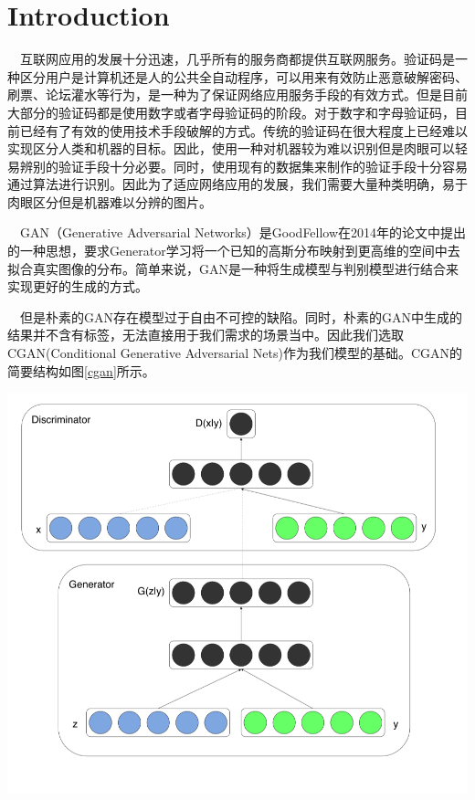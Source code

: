 \documentclass[12pt]{article}
\begin{document}
\section*{Introduction}

\ \ 互联网应用的发展十分迅速，几乎所有的服务商都提供互联网服务。验证码是一种区分用户是计算机还是人的公共全自动程序，可以用来有效防止恶意破解密码、刷票、论坛灌水等行为，是一种为了保证网络应用服务手段的有效方式。但是目前大部分的验证码都是使用数字或者字母验证码的阶段。对于数字和字母验证码，目前已经有了有效的使用技术手段破解的方式\supercite{10.1007}。传统的验证码在很大程度上已经难以实现区分人类和机器的目标。因此，使用一种对机器较为难以识别但是肉眼可以轻易辨别的验证手段十分必要。同时，使用现有的数据集来制作的验证手段十分容易通过算法进行识别。因此为了适应网络应用的发展，我们需要大量种类明确，易于肉眼区分但是机器难以分辨的图片。

\ \ GAN\supercite{NIPS2014_5423}（Generative Adversarial Networks）是GoodFellow在2014年的论文中提出的一种思想，要求Generator学习将一个已知的高斯分布映射到更高维的空间中去拟合真实图像的分布。简单来说，GAN是一种将生成模型与判别模型进行结合来实现更好的生成的方式。


\ \ 但是朴素的GAN存在模型过于自由不可控的缺陷。同时，朴素的GAN中生成的结果并不含有标签，无法直接用于我们需求的场景当中。因此我们选取CGAN\supercite{DBLP:journals/corr/MirzaO14}(Conditional Generative Adversarial Nets)作为我们模型的基础。CGAN的简要结构如图\ref{cgan}所示。

\begin{center}\vspace{1cm}
\includegraphics[width=0.8\linewidth]{CGAN.png}
\label{cgan}
\end{center}\vspace{1cm}
\end{document}
